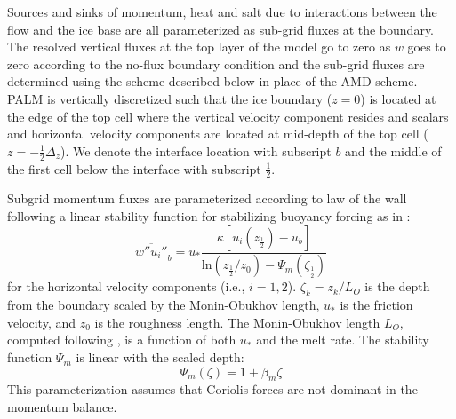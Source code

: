 \documentclass[draft]{agujournal2019}
\begin{document}
Sources and sinks of momentum, heat and salt due to interactions between the flow and the ice base are all parameterized as sub-grid fluxes at the boundary. The resolved vertical fluxes at the top layer of the model go to zero as $w$ goes to zero according to the no-flux boundary condition and the sub-grid fluxes are determined using the scheme described below in place of the AMD scheme. PALM is vertically discretized such that the ice boundary ($z=0$) is located at the edge of the top cell where the vertical velocity component resides and scalars and horizontal velocity components are located at mid-depth of the top cell ($z=-\frac{1}{2}\Delta_z$). We denote the interface location with subscript $b$ and the middle of the first cell below the interface with subscript $\frac{1}{2}$.

Subgrid momentum fluxes are parameterized according to law of the wall following a linear stability function for stabilizing buoyancy forcing as in :
%
\begin{equation} \label{eq:tau}
    \overline{w''u_i''}_b = u_* \frac{ \kappa \left[u_i\left(z_{\frac{1}{2}}\right) - u_b \right]}{\textrm{ln}\left(z_{\frac{1}{2}}/z_0\right)-\Psi_m\left(\zeta_{\frac{1}{2}}\right)}
\end{equation}
%
for the horizontal velocity components (i.e., $i=1,2$). $\zeta_k = z_k/L_O$ is the depth from the boundary scaled by the Monin-Obukhov length, $u_*$ is the friction velocity, and $z_0$ is the roughness length. The Monin-Obukhov length $L_O$, computed following , is a function of both $u_*$ and the melt rate. The stability function $\Psi_m$ is linear with the scaled depth:
\begin{equation}\label{eq:psi}
    \Psi_m(\zeta) = 1 + \beta_m \zeta
\end{equation}
This parameterization assumes that Coriolis forces are not dominant in the momentum balance.
\end{document}
